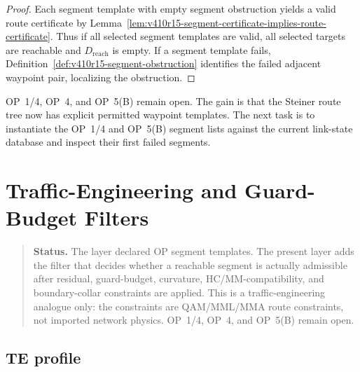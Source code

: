 \begin{proof}
Each segment template with empty segment obstruction yields a valid route
certificate by Lemma~\ref{lem:v410r15-segment-certificate-implies-route-certificate}.
Thus if all selected segment templates are valid, all selected targets are
reachable and \(D_{\mathrm{reach}}\) is empty. If a segment template fails,
Definition~\ref{def:v410r15-segment-obstruction} identifies the failed adjacent
waypoint pair, localizing the obstruction.
\end{proof}

\begin{remark}
\label{rem:v410r15-op-status}
OP~1/4, OP~4, and OP~5(B) remain open. The gain is that the Steiner route tree
now has explicit permitted waypoint templates. The next task is to instantiate
the OP~1/4 and OP~5(B) segment lists against the current link-state database and
inspect their first failed segments.
\end{remark}



\clearpage
\section{Traffic-Engineering and Guard-Budget Filters}
\label{sec:v410r16-te-guard-budget-filters}

\begin{quote}\small
\noindent\textbf{Status.}
The layer declared OP segment templates. The present layer adds the
filter that decides whether a reachable segment is actually admissible after
residual, guard-budget, curvature, HC/MM-compatibility, and boundary-collar
constraints are applied. This is a traffic-engineering analogue only: the
constraints are QAM/MML/MMA route constraints, not imported network physics.
OP~1/4, OP~4, and OP~5(B) remain open.
\end{quote}

\subsection{TE profile}
\label{subsec:v410r16-te-profile}

